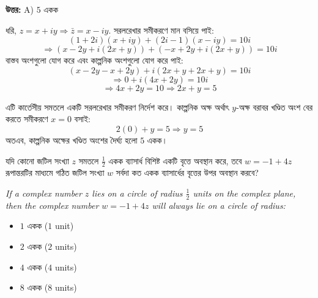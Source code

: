 \documentclass[12pt, a4paper]{article}
\begin{document}
\vspace{0.5em}
\begin{tcolorbox}[answerbox]
    \textbf{\color{success} উত্তর:} A) $5$ একক
\end{tcolorbox}
\vspace{1em}

\begin{tcolorbox}[solutionbox={সমাধান (Solution)}]
    \noindent
    ধরি, $z = x + iy \Rightarrow \bar{z} = x - iy$. সরলরেখার সমীকরণে মান বসিয়ে পাই:
    \[ (1+2i)(x+iy) + (2i-1)(x-iy) = 10i \]
    \[ \Rightarrow (x - 2y + i(2x + y)) + (-x + 2y + i(2x + y)) = 10i \]
    বাস্তব অংশগুলো যোগ করে এবং কাল্পনিক অংশগুলো যোগ করে পাই:
    \[ (x - 2y - x + 2y) + i(2x + y + 2x + y) = 10i \]
    \[ \Rightarrow 0 + i(4x + 2y) = 10i \]
    \[ \Rightarrow 4x + 2y = 10 \Rightarrow 2x + y = 5 \]
    
    \vspace{0.5em}
    এটি কার্তেসীয় সমতলে একটি সরলরেখার সমীকরণ নির্দেশ করে। কাল্পনিক অক্ষ অর্থাৎ $y$-অক্ষ বরাবর খণ্ডিত অংশ বের করতে সমীকরণে $x = 0$ বসাই:
    \[ 2(0) + y = 5 \Rightarrow y = 5 \]
    অতএব, কাল্পনিক অক্ষের খণ্ডিত অংশের দৈর্ঘ্য হলো $5$ একক।
\end{tcolorbox}
\vspace{1em}

\begin{tcolorbox}[questionbox={প্রশ্ন (Question) 4}]
    \noindent
    যদি কোনো জটিল সংখ্যা $z$ সমতলে $\frac{1}{2}$ একক ব্যাসার্ধ বিশিষ্ট একটি বৃত্তে অবস্থান করে, তবে $w = -1 + 4z$ রূপান্তরটির মাধ্যমে গঠিত জটিল সংখ্যা $w$ সর্বদা কত একক ব্যাসার্ধের বৃত্তের উপর অবস্থান করবে?
    
    \vspace{0.8em}
    \begin{english}
    \noindent\textit{\color{darkgray}
    If a complex number $z$ lies on a circle of radius $\frac{1}{2}$ units on the complex plane, then the complex number $w = -1 + 4z$ will always lie on a circle of radius:
    }
    \end{english}
\end{tcolorbox}

\begin{itemize}[label={}, leftmargin=1cm, itemsep=0.5em]
    \item[\textbf{A)}] $1$ একক ($1$ unit)
    \item[\textbf{B)}] $2$ একক ($2$ units)
    \item[\textbf{C)}] $4$ একক ($4$ units)
    \item[\textbf{D)}] $8$ একক ($8$ units)
\end{itemize}
\end{document}
